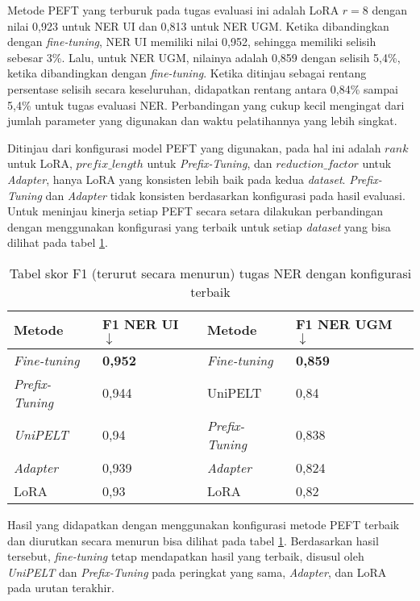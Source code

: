 Metode PEFT yang terburuk pada tugas evaluasi ini adalah LoRA $r=8$ dengan nilai 0,923 untuk NER UI dan 0,813 untuk NER UGM. Ketika dibandingkan dengan \textit{fine-tuning}, NER UI memiliki nilai 0,952, sehingga memiliki selisih sebesar 3\%. Lalu, untuk NER UGM, nilainya adalah 0,859 dengan selisih 5,4\%, ketika dibandingkan dengan \textit{fine-tuning}. Ketika ditinjau sebagai rentang persentase selisih secara keseluruhan, didapatkan rentang antara 0,84\% sampai 5,4\% untuk tugas evaluasi NER. Perbandingan yang cukup kecil mengingat dari jumlah parameter yang digunakan dan waktu pelatihannya yang lebih singkat.

Ditinjau dari konfigurasi model PEFT yang digunakan, pada hal ini adalah $rank$ untuk LoRA, $prefix\_length$ untuk \textit{Prefix-Tuning}, dan $reduction\_factor$ untuk \textit{Adapter}, hanya LoRA yang konsisten lebih baik pada kedua \textit{dataset}. \textit{Prefix-Tuning} dan \textit{Adapter} tidak konsisten berdasarkan konfigurasi pada hasil evaluasi. Untuk meninjau kinerja setiap PEFT secara setara dilakukan perbandingan dengan menggunakan konfigurasi yang terbaik untuk setiap \textit{dataset} yang bisa dilihat pada tabel \ref{table:ner-result-desc}.

\begin{table}[h]
    \centering
    \caption{Tabel skor F1 (terurut secara menurun) tugas NER dengan konfigurasi terbaik}
    \label{table:ner-result-desc}
    \begin{tabular}{ll|ll}
        \toprule
        \textbf{Metode} & \textbf{F1 NER UI $\downarrow$} & \textbf{Metode} & \textbf{F1 NER UGM $\downarrow$} \\
        \midrule
        \textit{Fine-tuning} & \textbf{0,952} & \textit{Fine-tuning} & \textbf{0,859} \\
        \textit{Prefix-Tuning} & 0,944 & UniPELT & 0,84 \\
        \textit{UniPELT} & 0,94 & \textit{Prefix-Tuning} & 0,838 \\
        \textit{Adapter} & 0,939 & \textit{Adapter} & 0,824 \\
        LoRA & 0,93 & LoRA & 0,82 \\
        \bottomrule
    \end{tabular}
\end{table}

Hasil yang didapatkan dengan menggunakan konfigurasi metode PEFT terbaik dan diurutkan secara menurun bisa dilihat pada tabel \ref{table:ner-result-desc}. Berdasarkan hasil tersebut, \textit{fine-tuning} tetap mendapatkan hasil yang terbaik, disusul oleh \textit{UniPELT} dan \textit{Prefix-Tuning} pada peringkat yang sama, \textit{Adapter}, dan LoRA pada urutan terakhir.

